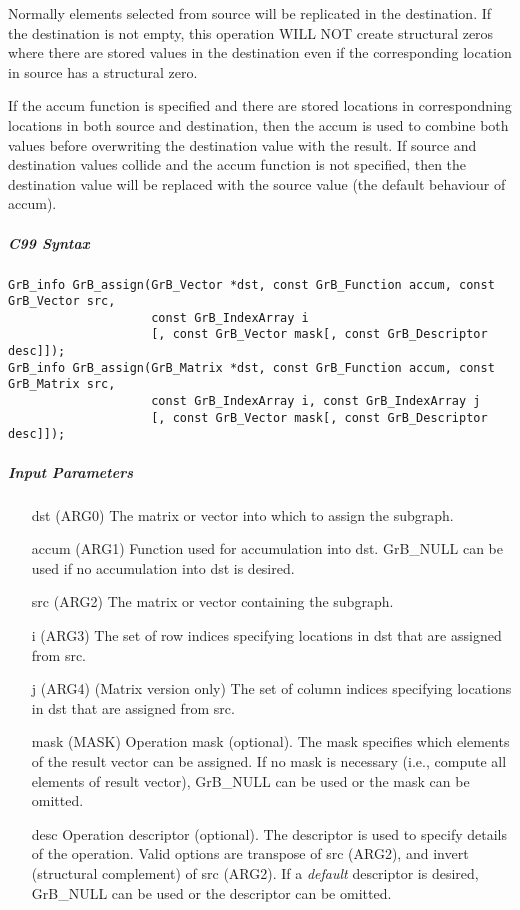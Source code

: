 Normally elements selected from source will be replicated in the destination.  If the
destination is not empty, this operation WILL NOT create structural zeros where there
are stored values in the destination even if the corresponding location in source 
has a structural zero.

If the {\sf accum} function is specified and there are stored locations in correspondning
locations in both source and destination, then the
{\sf accum} is used to combine both values before overwriting the destination value
with the result.  If source and destination values collide and the {\sf accum} function is
not specified, then the destination value will be replaced with the source value (the
default behaviour of {\sf accum}).

\subparagraph{C99 Syntax}

\begin{verbatim}
GrB_info GrB_assign(GrB_Vector *dst, const GrB_Function accum, const GrB_Vector src,
                    const GrB_IndexArray i
                    [, const GrB_Vector mask[, const GrB_Descriptor desc]]);
GrB_info GrB_assign(GrB_Matrix *dst, const GrB_Function accum, const GrB_Matrix src,
                    const GrB_IndexArray i, const GrB_IndexArray j
                    [, const GrB_Vector mask[, const GrB_Descriptor desc]]);
\end{verbatim}

\subparagraph{Input Parameters}

\begin{itemize}
	\item[{\sf dst}]   ({\sf ARG0}) The matrix or vector into which to assign the subgraph.
	\item[{\sf accum}] ({\sf ARG1}) Function used for accumulation into dst.  {\sf GrB\_NULL}
                       can be used if no accumulation into dst is desired.
	\item[{\sf src}]   ({\sf ARG2}) The matrix or vector containing the subgraph.
	\item[{\sf i}]     ({\sf ARG3}) The set of row indices specifying locations in dst that
                       are assigned from src.
	\item[{\sf j}]     ({\sf ARG4}) (Matrix version only) The set of column indices specifying
                       locations in dst that are assigned from src.

	\item[{\sf mask}]  ({\sf MASK}) Operation mask (optional). The mask
	specifies which elements of the result vector can be assigned.
	If no mask is necessary (i.e., compute all elements of result
	vector), {\sf GrB\_NULL} can be used or the mask can be omitted.

	\item[{\sf desc}]  Operation descriptor (optional). The descriptor
    is used to specify details of the operation. Valid options are transpose
    of src ({\sf ARG2}), and invert (structural complement) of src ({\sf ARG2}). If
    a \emph{default} descriptor is desired,	{\sf GrB\_NULL} can be
    used or the descriptor can be omitted.
\end{itemize}

